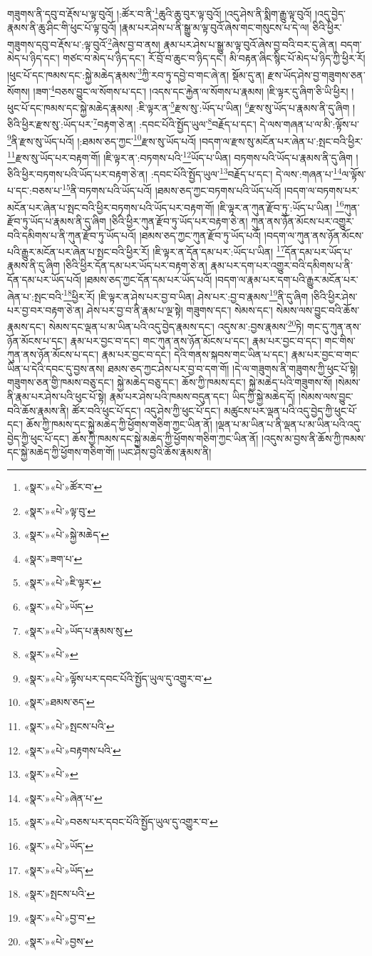 གཟུགས་ནི་དབུ་བ་རྡོས་པ་ལྟ་བུའོ། །:ཚོར་བ་ནི་\footnote{«སྣར་»«པེ་»ཚོར་བ་}ཆུའི་ཆུ་བུར་ལྟ་བུའོ། །འདུ་ཤེས་ནི་སྨིག་རྒྱུ་ལྟ་བུའོ། །འདུ་བྱེད་རྣམས་ནི་ཆུ་ཤིང་གི་ཕུང་པོ་ལྟ་བུའོ། །རྣམ་པར་ཤེས་པ་ནི་སྒྱུ་མ་ལྟ་བུའོ་ཞེས་གང་གསུངས་པ་དེ་ལ། ཅིའི་ཕྱིར་གཟུགས་དབུ་བ་རྡོས་པ་:ལྟ་བུའོ་\footnote{«སྣར་»«པེ་»ལྟ་བུ་}ཞེས་བྱ་བ་ནས། རྣམ་པར་ཤེས་པ་སྒྱུ་མ་ལྟ་བུའོ་ཞེས་བྱ་བའི་བར་དུ་ཞེ་ན། བདག་མེད་པ་ཉིད་དང་། གཙང་བ་མེད་པ་ཉིད་དང་། རོ་བྲོ་བ་ཆུང་བ་ཉིད་དང་། མི་བརྟན་ཞིང་སྙིང་པོ་མེད་པ་ཉིད་ཀྱི་ཕྱིར་རོ། །ཕུང་པོ་དང་ཁམས་དང་:སྐྱེ་མཆེད་རྣམས་\footnote{«སྣར་»«པེ་»སྐྱེ་མཆེད་}ཀྱི་རབ་ཏུ་དབྱེ་བ་གང་ཞེ་ན། སྡོམ་དུ་ན། རྫས་ཡོད་ཤེས་བྱ་གཟུགས་ཅན་སོགས། །ཟག་\footnote{«སྣར་»ཟག་པ་}བཅས་བྱུང་ལ་སོགས་པ་དང་། །འདས་དང་རྐྱེན་ལ་སོགས་པ་རྣམས། །ཇི་ལྟར་དུ་ཞིག་ཅི་ཡི་ཕྱིར། །ཕུང་པོ་དང་ཁམས་དང་སྐྱེ་མཆེད་རྣམས། :ཇི་ལྟར་ན་\footnote{«སྣར་»«པེ་»ཇི་ལྟར་}རྫས་སུ་:ཡོད་པ་ཡིན། \footnote{«སྣར་»«པེ་»ཡོད་}རྫས་སུ་ཡོད་པ་རྣམས་ནི་དུ་ཞིག །ཅིའི་ཕྱིར་རྫས་སུ་:ཡོད་པར་\footnote{«སྣར་»«པེ་»ཡོད་པ་རྣམས་སུ་}བརྟག་ཅེ་ན། :དབང་པོའི་སྤྱོད་ཡུལ་\footnote{«སྣར་»«པེ་»}བརྗོད་པ་དང་། དེ་ལས་གཞན་པ་ལ་མི་:ལྟོས་པ་\footnote{«སྣར་»«པེ་»ལྟོས་པར་དབང་པོའི་སྤྱོད་ཡུལ་དུ་འགྱུར་བ་}ནི་རྫས་སུ་ཡོད་པའོ། །:ཐམས་ཅད་ཀྱང་\footnote{«སྣར་»ཐམས་ཅད་}རྫས་སུ་ཡོད་པའོ། །བདག་ལ་རྫས་སུ་མངོན་པར་ཞེན་པ་:སྤང་བའི་ཕྱིར་\footnote{«སྣར་»«པེ་»སྤངས་པའི་}རྫས་སུ་ཡོད་པར་བརྟག་གོ། །ཇི་ལྟར་ན་:བཏགས་པའི་\footnote{«སྣར་»«པེ་»བརྟགས་པའི་}ཡོད་པ་ཡིན། བཏགས་པའི་ཡོད་པ་རྣམས་ནི་དུ་ཞིག །ཅིའི་ཕྱིར་བཏགས་པའི་ཡོད་པར་བརྟག་ཅེ་ན། :དབང་པོའི་སྤྱོད་ཡུལ་\footnote{«སྣར་»«པེ་»}བརྗོད་པ་དང་། དེ་ལས་:གཞན་པ་\footnote{«སྣར་»«པེ་»ཞེན་པ་}ལ་ལྟོས་པ་དང་:བཅས་པ་\footnote{«སྣར་»«པེ་»བཅས་པར་དབང་པོའི་སྤྱོད་ཡུལ་དུ་འགྱུར་བ་}ནི་བཏགས་པའི་ཡོད་པའོ། །ཐམས་ཅད་ཀྱང་བཏགས་པའི་ཡོད་པའོ། །བདག་ལ་བཏགས་པར་མངོན་པར་ཞེན་པ་སྤང་བའི་ཕྱིར་བཏགས་པའི་ཡོད་པར་བརྟག་གོ། །ཇི་ལྟར་ན་ཀུན་རྫོབ་ཏུ་:ཡོད་པ་ཡིན། \footnote{«སྣར་»«པེ་»ཡོད་}ཀུན་རྫོབ་ཏུ་ཡོད་པ་རྣམས་ནི་དུ་ཞིག །ཅིའི་ཕྱིར་ཀུན་རྫོབ་ཏུ་ཡོད་པར་བརྟག་ཅེ་ན། ཀུན་ནས་ཉོན་མོངས་པར་འགྱུར་བའི་དམིགས་པ་ནི་ཀུན་རྫོབ་ཏུ་ཡོད་པའོ། །ཐམས་ཅད་ཀྱང་ཀུན་རྫོབ་ཏུ་ཡོད་པའོ། །བདག་ལ་ཀུན་ནས་ཉོན་མོངས་པའི་རྒྱུར་མངོན་པར་ཞེན་པ་སྤང་བའི་ཕྱིར་རོ། །ཇི་ལྟར་ན་དོན་དམ་པར་:ཡོད་པ་ཡིན། \footnote{«སྣར་»«པེ་»ཡོད་}དོན་དམ་པར་ཡོད་པ་རྣམས་ནི་དུ་ཞིག །ཅིའི་ཕྱིར་དོན་དམ་པར་ཡོད་པར་བརྟག་ཅེ་ན། རྣམ་པར་དག་པར་འགྱུར་བའི་དམིགས་པ་ནི་དོན་དམ་པར་ཡོད་པའོ། །ཐམས་ཅད་ཀྱང་དོན་དམ་པར་ཡོད་པའོ། །བདག་ལ་རྣམ་པར་དག་པའི་རྒྱུར་མངོན་པར་ཞེན་པ་:སྤང་བའི་\footnote{«སྣར་»སྤངས་པའི་}ཕྱིར་རོ། །ཇི་ལྟར་ན་ཤེས་པར་བྱ་བ་ཡིན། ཤེས་པར་:བྱ་བ་རྣམས་\footnote{«སྣར་»«པེ་»བྱ་བ་}ནི་དུ་ཞིག །ཅིའི་ཕྱིར་ཤེས་པར་བྱ་བར་བརྟག་ཅེ་ན། ཤེས་པར་བྱ་བ་ནི་རྣམ་པ་ལྔ་སྟེ། གཟུགས་དང་། སེམས་དང་། སེམས་ལས་བྱུང་བའི་ཆོས་རྣམས་དང་། སེམས་དང་ལྡན་པ་མ་ཡིན་པའི་འདུ་བྱེད་རྣམས་དང་། འདུས་མ་:བྱས་རྣམས་\footnote{«སྣར་»«པེ་»བྱས་}ཏེ། གང་དུ་ཀུན་ནས་ཉོན་མོངས་པ་དང་། རྣམ་པར་བྱང་བ་དང་། གང་ཀུན་ནས་ཉོན་མོངས་པ་དང་། རྣམ་པར་བྱང་བ་དང་། གང་གིས་ཀུན་ནས་ཉོན་མོངས་པ་དང་། རྣམ་པར་བྱང་བ་དང་། དེའི་གནས་སྐབས་གང་ཡིན་པ་དང་། རྣམ་པར་བྱང་བ་གང་ཡིན་པ་དེའི་དབང་དུ་བྱས་ནས། ཐམས་ཅད་ཀྱང་ཤེས་པར་བྱ་བ་དག་གོ། །དེ་ལ་གཟུགས་ནི་གཟུགས་ཀྱི་ཕུང་པོ་སྟེ། གཟུགས་ཅན་གྱི་ཁམས་བཅུ་དང་། སྐྱེ་མཆེད་བཅུ་དང་། ཆོས་ཀྱི་ཁམས་དང་། སྐྱེ་མཆེད་པའི་གཟུགས་སོ། །སེམས་ནི་རྣམ་པར་ཤེས་པའི་ཕུང་པོ་སྟེ། རྣམ་པར་ཤེས་པའི་ཁམས་བདུན་དང་། ཡིད་ཀྱི་སྐྱེ་མཆེད་དོ། །སེམས་ལས་བྱུང་བའི་ཆོས་རྣམས་ནི། ཚོར་བའི་ཕུང་པོ་དང་། འདུ་ཤེས་ཀྱི་ཕུང་པོ་དང་། མཚུངས་པར་ལྡན་པའི་འདུ་བྱེད་ཀྱི་ཕུང་པོ་དང་། ཆོས་ཀྱི་ཁམས་དང་སྐྱེ་མཆེད་ཀྱི་ཕྱོགས་གཅིག་ཀྱང་ཡིན་ནོ། །ལྡན་པ་མ་ཡིན་པ་ནི་ལྡན་པ་མ་ཡིན་པའི་འདུ་བྱེད་ཀྱི་ཕུང་པོ་དང་། ཆོས་ཀྱི་ཁམས་དང་སྐྱེ་མཆེད་ཀྱི་ཕྱོགས་གཅིག་ཀྱང་ཡིན་ནོ། །འདུས་མ་བྱས་ནི་ཆོས་ཀྱི་ཁམས་དང་སྐྱེ་མཆེད་ཀྱི་ཕྱོགས་གཅིག་གོ། །ཡང་ཤེས་བྱའི་ཆོས་རྣམས་ནི། 